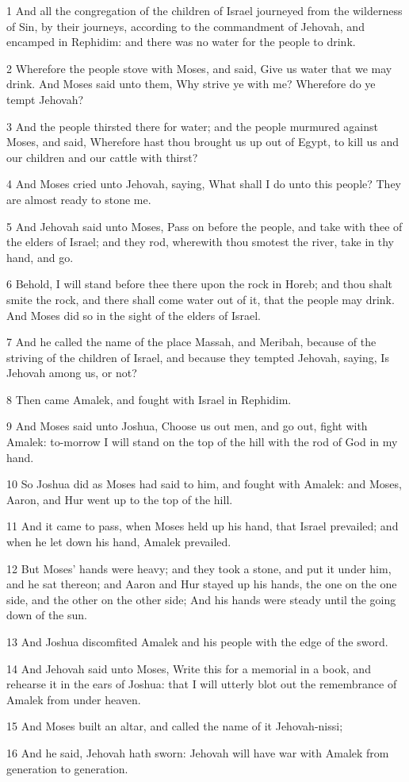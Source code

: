 \par 1 And all the congregation of the children of Israel journeyed from the wilderness of Sin, by their journeys, according to the commandment of Jehovah, and encamped in Rephidim: and there was no water for the people to drink.
\par 2 Wherefore the people stove with Moses, and said, Give us water that we may drink. And Moses said unto them, Why strive ye with me? Wherefore do ye tempt Jehovah?
\par 3 And the people thirsted there for water; and the people murmured against Moses, and said, Wherefore hast thou brought us up out of Egypt, to kill us and our children and our cattle with thirst?
\par 4 And Moses cried unto Jehovah, saying, What shall I do unto this people? They are almost ready to stone me.
\par 5 And Jehovah said unto Moses, Pass on before the people, and take with thee of the elders of Israel; and they rod, wherewith thou smotest the river, take in thy hand, and go.
\par 6 Behold, I will stand before thee there upon the rock in Horeb; and thou shalt smite the rock, and there shall come water out of it, that the people may drink. And Moses did so in the sight of the elders of Israel.
\par 7 And he called the name of the place Massah, and Meribah, because of the striving of the children of Israel, and because they tempted Jehovah, saying, Is Jehovah among us, or not?
\par 8 Then came Amalek, and fought with Israel in Rephidim.
\par 9 And Moses said unto Joshua, Choose us out men, and go out, fight with Amalek: to-morrow I will stand on the top of the hill with the rod of God in my hand.
\par 10 So Joshua did as Moses had said to him, and fought with Amalek: and Moses, Aaron, and Hur went up to the top of the hill.
\par 11 And it came to pass, when Moses held up his hand, that Israel prevailed; and when he let down his hand, Amalek prevailed.
\par 12 But Moses' hands were heavy; and they took a stone, and put it under him, and he sat thereon; and Aaron and Hur stayed up his hands, the one on the one side, and the other on the other side; And his hands were steady until the going down of the sun.
\par 13 And Joshua discomfited Amalek and his people with the edge of the sword.
\par 14 And Jehovah said unto Moses, Write this for a memorial in a book, and rehearse it in the ears of Joshua: that I will utterly blot out the remembrance of Amalek from under heaven.
\par 15 And Moses built an altar, and called the name of it Jehovah-nissi;
\par 16 And he said, Jehovah hath sworn: Jehovah will have war with Amalek from generation to generation.

